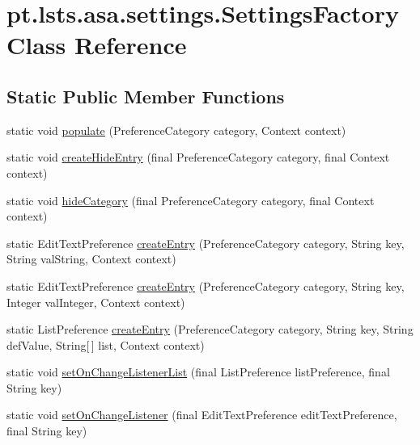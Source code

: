 \hypertarget{classpt_1_1lsts_1_1asa_1_1settings_1_1SettingsFactory}{}\section{pt.\+lsts.\+asa.\+settings.\+Settings\+Factory Class Reference}
\label{classpt_1_1lsts_1_1asa_1_1settings_1_1SettingsFactory}
\subsection*{Static Public Member Functions}
\begin{DoxyCompactItemize}
\item 
static void \hyperlink{classpt_1_1lsts_1_1asa_1_1settings_1_1SettingsFactory_a27da95491a651aa134419c9c18c07cd3}{populate} (Preference\+Category category, Context context)
\item 
static void \hyperlink{classpt_1_1lsts_1_1asa_1_1settings_1_1SettingsFactory_aee4619d49421e55d2bc288d3f1610d0b}{create\+Hide\+Entry} (final Preference\+Category category, final Context context)
\item 
static void \hyperlink{classpt_1_1lsts_1_1asa_1_1settings_1_1SettingsFactory_abb74f0c25a9264be87dc2aae833fbee1}{hide\+Category} (final Preference\+Category category, final Context context)
\item 
static Edit\+Text\+Preference \hyperlink{classpt_1_1lsts_1_1asa_1_1settings_1_1SettingsFactory_ac32bac1bc3e48e5b5b77baca25fc3cbd}{create\+Entry} (Preference\+Category category, String key, String val\+String, Context context)
\item 
static Edit\+Text\+Preference \hyperlink{classpt_1_1lsts_1_1asa_1_1settings_1_1SettingsFactory_aae1ea5e96ec547700aca606e3aa8c37e}{create\+Entry} (Preference\+Category category, String key, Integer val\+Integer, Context context)
\item 
static List\+Preference \hyperlink{classpt_1_1lsts_1_1asa_1_1settings_1_1SettingsFactory_a789f78313a638145189378e8a1673bc1}{create\+Entry} (Preference\+Category category, String key, String def\+Value, String\mbox{[}$\,$\mbox{]} list, Context context)
\item 
static void \hyperlink{classpt_1_1lsts_1_1asa_1_1settings_1_1SettingsFactory_a72b78f701ec947d31cbe87048a94be85}{set\+On\+Change\+Listener\+List} (final List\+Preference list\+Preference, final String key)
\item 
static void \hyperlink{classpt_1_1lsts_1_1asa_1_1settings_1_1SettingsFactory_ac2fc15398877a19a84a65f56abef35cc}{set\+On\+Change\+Listener} (final Edit\+Text\+Preference edit\+Text\+Preference, final String key)

\end{DoxyCompactItemize}
